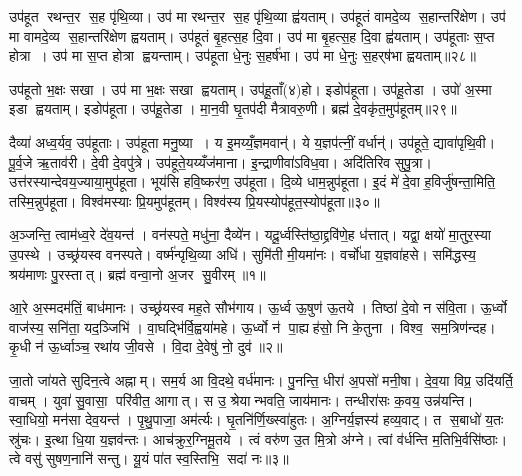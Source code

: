 उप॑हूत रथन्त॒र स॒ह पृ॑थि॒व्या। उप॑ मा रथन्त॒र स॒ह पृ॑थि॒व्या ह्व॑यताम्। उप॑हूतं वामदे॒व्य स॒हान्तरि॑क्षेण। उप॑ मा वामदे॒व्य स॒हान्तरि॑क्षेण ह्वयताम्। उप॑हूतं बृ॒हत्स॒ह दि॒वा। उप॑ मा बृ॒हत्स॒ह दि॒वा ह्व॑यताम्। उप॑हूताः स॒प्त होत्रा। उप॑ मा स॒प्त होत्रा ह्वयन्ताम्। उप॑हूता धे॒नुः स॒हर्ष॑भा। उप॑ मा धे॒नुः स॒हर्‌ष॑भा ह्वयताम्॥२८॥

उप॑हूतो भ॒क्षः सखा। उप॑ मा भ॒क्षः सखा ह्वयताम्। उप॑हू॒ताँ(४)हो। इडोप॑हूता। उप॑हू॒तेडा। उपो॑ अ॒स्मा इडा ह्वयताम्। इडोप॑हूता। उप॑हू॒तेडा। मा॒न॒वी घृ॒तप॑दी मैत्रावरु॒णी। ब्रह्म॑ दे॒वकृ॑त॒मुप॑हूतम्॥२९॥

दैव्या॑ अध्व॒र्यव॒ उप॑हूताः। उप॑हूता मनु॒ष्या। य इ॒मय्यँ॒ज्ञमवान्॑। ये य॒ज्ञप॑त्नीं॒ वर्धान्॑। उप॑हूते॒ द्यावा॑पृथि॒वी। पू॒र्व॒जे ऋ॒ताव॑री। दे॒वी दे॒वपु॑त्रे। उप॑हूते॒यय्यँज॑माना। इ॒न्द्राणीवा॑ऽविध॒वा। अदि॑तिरिव सुपु॒त्रा। उत्त॑रस्यान्देवय॒ज्याया॒मुप॑हूता। भूय॑सि हवि॒ष्कर॑ण॒ उप॑हूता। दि॒व्ये धाम॒न्नुप॑हूता। इ॒दं मे॑ दे॒वा ह॒विर्जु॑षन्ता॒मिति॒ तस्मि॒न्नुप॑हूता। विश्व॑मस्याः प्रि॒यमुप॑हूतम्। विश्व॑स्य प्रि॒यस्योप॑हूत॒स्योप॑हूता॥३०॥



\clearpage
{}
\setcounter{anuvakam}{0}
अ॒ञ्जन्ति॒ त्वाम॑ध्व॒रे दे॑व॒यन्त॑। वन॑स्पते॒ मधु॑ना॒ दैव्ये॑न। यदू॒र्ध्वस्ति॑ष्ठा॒द्द्रवि॑णे॒ह ध॑त्तात्। यद्वा॒ क्षयो॑ मा॒तुर॒स्या उ॒पस्थे। उच्छ्र॑यस्व वनस्पते। वर्ष्म॑न्पृथि॒व्या अधि॑। सुमि॑ती मी॒यमा॑नः। वर्चो॑धा य॒ज्ञवा॑हसे। समि॑द्धस्य॒ श्रय॑माणः पु॒रस्तात्। ब्रह्म॑ वन्वा॒नो अ॒जर सु॒वीरम्॥१॥

आ॒रे अ॒स्मदम॑तिं॒ बाध॑मानः। उच्छ्र॑यस्व मह॒ते सौभ॑गाय। ऊ॒र्ध्व ऊ॒षुण॑ ऊ॒तये। तिष्ठा॑ दे॒वो न स॑वि॒ता। ऊ॒र्ध्वो वाज॑स्य॒ सनि॑ता॒ यद॒ञ्जिभि॑। वा॒घद्भि॑र्वि॒ह्वया॑महे। ऊ॒र्ध्वो न॑ पा॒ह्यह॑सो॒ नि के॒तुना। विश्व॒ सम॒त्रिण॑न्दह। कृ॒धी न॑ ऊ॒र्ध्वाञ्च॒ रथा॑य जी॒वसे। वि॒दा दे॒वेषु॑ नो॒ दुव॑॥२॥

जा॒तो जा॑यते सुदिन॒त्वे अह्नाम्। सम॒र्य आ वि॒दथे॒ वर्ध॑मानः। पु॒नन्ति॒ धीरा॑ अ॒पसो॑ मनी॒षा। दे॒व॒या विप्र॒ उदि॑यर्ति॒ वाचम्। युवा॑ सु॒वासा॒ परि॑वीत॒ आगात्। स उ॒ श्रेयान्भवति॒ जाय॑मानः। तन्धीरा॑सः क॒वय॒ उन्न॑यन्ति। स्वा॒धियो॒ मन॑सा देव॒यन्त॑। पृ॒थु॒पाजा॒ अम॑र्त्यः। घृ॒तनि॑र्णि॒ख्स्वा॑हुतः। अ॒ग्निर्य॒ज्ञस्य॑ हव्य॒वाट्। त स॒बाधो॑ य॒तः स्रु॑चः। इ॒त्था धि॒या य॒ज्ञव॑न्तः। आच॑क्रुर॒ग्निमू॒तये। त्वं वरु॑ण उ॒त मि॒त्रो अ॑ग्ने। त्वां व॑र्धन्ति म॒तिभि॒र्वसि॑ष्ठाः। त्वे वसु॑ सुषण॒नानि॑ सन्तु। यू॒यं पा॑त स्व॒स्तिभि॒ सदा॑ नः॥३॥\anuvakamend[सु॒वीर॒न्दुव॒ स्वा॑हुतो॒ऽष्टौ च॑]

